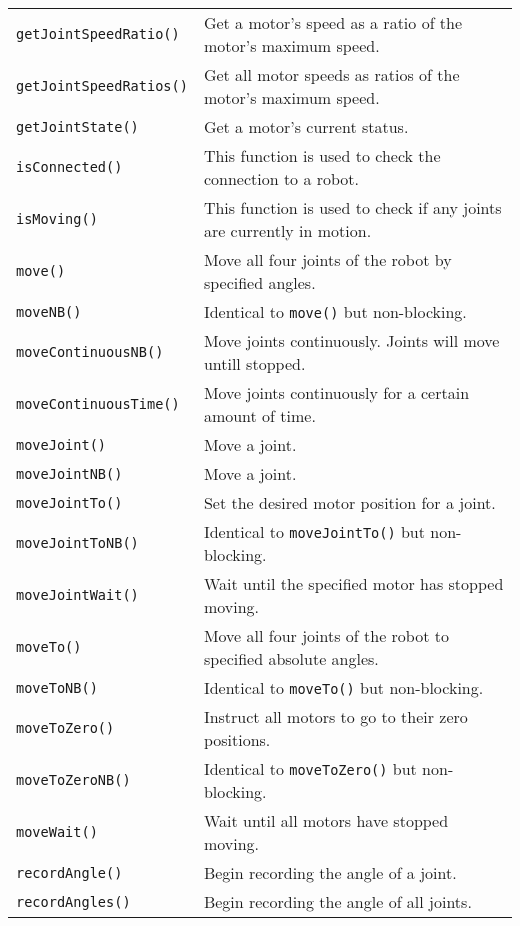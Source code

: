 \begin{table}[!h]
\begin{center}
\begin{tabular}{p{48 mm}p{110 mm}}
\texttt{getJointSpeedRatio()} & Get a motor's speed as a ratio of the motor's maximum speed. \\
\texttt{getJointSpeedRatios()} & Get all motor speeds as ratios of the motor's maximum speed. \\
\texttt{getJointState()} & Get a motor's current status. \\
\texttt{isConnected()} & This function is used to check the connection to a robot. \\
\texttt{isMoving()} & This function is used to check if any joints are currently in motion. \\
\texttt{move()} & Move all four joints of the robot by specified angles. \\
\texttt{moveNB()} & Identical to \texttt{move()} but non-blocking. \\
\texttt{moveContinuousNB()} & Move joints continuously. Joints will move untill stopped.\\
\texttt{moveContinuousTime()} & Move joints continuously for a certain amount of time.\\
\texttt{moveJoint()} & Move a joint. \\
\texttt{moveJointNB()} & Move a joint. \\
\texttt{moveJointTo()} & Set the desired motor position for a joint. \\
\texttt{moveJointToNB()} & Identical to \texttt{moveJointTo()} but non-blocking. \\
\texttt{moveJointWait()} & Wait until the specified motor has stopped moving. \\
\texttt{moveTo()} & Move all four joints of the robot to specified absolute angles. \\
\texttt{moveToNB()} & Identical to \texttt{moveTo()} but non-blocking. \\
\texttt{moveToZero()} & Instruct all motors to go to their zero positions. \\
\texttt{moveToZeroNB()} & Identical to \texttt{moveToZero()} but non-blocking. \\
\texttt{moveWait()} & Wait until all motors have stopped moving. \\
\texttt{recordAngle()} & Begin recording the angle of a joint. \\
\texttt{recordAngles()} & Begin recording the angle of all joints. \\

\end{tabular}
\end{center}
\end{table}
